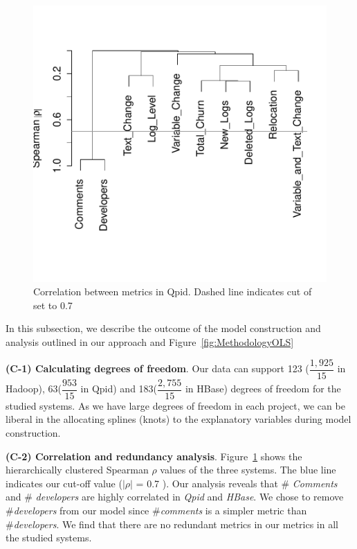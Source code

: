\begin{figure}[t]
	\centering 
	\begin{minipage}[b]{0.8\columnwidth}
		
		\includegraphics[width=.81\columnwidth]{QpidSpearman}	
	\end{minipage}
	
	\caption{Correlation between metrics in Qpid. Dashed line indicates cut of set to 0.7\label{fig:Correlation}}
\end{figure}

In this subsection, we describe the outcome of the model construction and analysis outlined in our approach and Figure~\ref{fig:MethodologyOLS}

\textbf{(C-1) Calculating degrees of freedom}. Our data can support 123 ($\dfrac{1,925}{15}$ in Hadoop), 63($\dfrac{953}{15}$ in Qpid) and 183($\dfrac{2,755}{15} $ in HBase) degrees of freedom for the studied systems. As we have large degrees of freedom in each project, we can be liberal in the allocating splines (knots) to the explanatory variables during model construction. 


\textbf{{(C-2) Correlation and redundancy analysis}}. Figure~\ref{fig:Correlation} shows the hierarchically clustered Spearman $\rho$ values of the three systems. The blue line indicates our cut-off value ($|\rho|$ = 0.7 ). Our analysis reveals that \# \textsl{Comments} and \# \textsl{developers} are highly correlated in \emph{Qpid} and \emph{HBase}. We chose to remove \#\textsl{developers} from our model since \#\textsl{comments} is a simpler metric than \#\textsl{developers}. We find that there are no redundant metrics in our metrics in all the studied systems.


